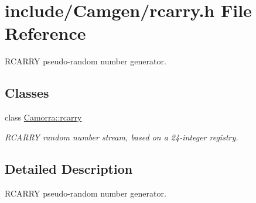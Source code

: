 \hypertarget{a00590}{
\section{include/Camgen/rcarry.h File Reference}
\label{a00590}
}


RCARRY pseudo-\/random number generator.  


\subsection*{Classes}
\begin{DoxyCompactItemize}
\item 
class \hyperlink{a00423}{Camorra::rcarry}
\begin{DoxyCompactList}\small\item\em RCARRY random number stream, based on a 24-\/integer registry. \end{DoxyCompactList}\end{DoxyCompactItemize}


\subsection{Detailed Description}
RCARRY pseudo-\/random number generator. 